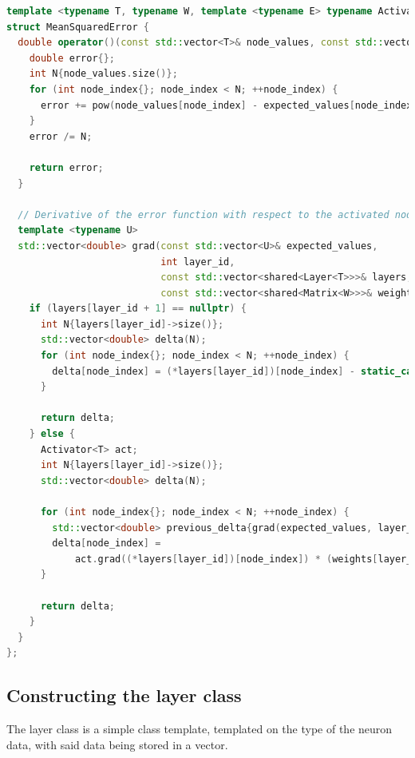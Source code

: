 \documentclass[12pt]{article}
\begin{document}
\begin{lstlisting}[language=C++]
template <typename T, typename W, template <typename E> typename Activator>
struct MeanSquaredError {
  double operator()(const std::vector<T>& node_values, const std::vector<T>& expected_values) {
    double error{};
    int N{node_values.size()};
    for (int node_index{}; node_index < N; ++node_index) {
      error += pow(node_values[node_index] - expected_values[node_index], 2);
    }
    error /= N;

    return error;
  }

  // Derivative of the error function with respect to the activated node values
  template <typename U>
  std::vector<double> grad(const std::vector<U>& expected_values,
                           int layer_id,
                           const std::vector<shared<Layer<T>>>& layers,
                           const std::vector<shared<Matrix<W>>>& weights) {
    if (layers[layer_id + 1] == nullptr) {
      int N{layers[layer_id]->size()};
      std::vector<double> delta(N);
      for (int node_index{}; node_index < N; ++node_index) {
        delta[node_index] = (*layers[layer_id])[node_index] - static_cast<T>(expected_values[node_index]);
      }

      return delta;
    } else {
      Activator<T> act;
      int N{layers[layer_id]->size()};
      std::vector<double> delta(N);

      for (int node_index{}; node_index < N; ++node_index) {
        std::vector<double> previous_delta{grad(expected_values, layer_id + 1, layers, weights)};
        delta[node_index] =
            act.grad((*layers[layer_id])[node_index]) * (weights[layer_id]->transpose() * previous_delta)[node_index];
      }

      return delta;
    }
  }
};
\end{lstlisting}

\subsection{Constructing the layer class}
The layer class is a simple class template, templated on the type of the neuron data, with said data being 
stored in a vector.
\end{document}
